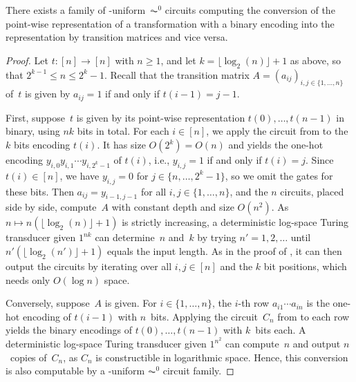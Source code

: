 \begin{proposition}
	\label{prelim:thm:point-wise-to-matrices-in-AC0}
	There exists a family of \LOGSPACE-uniform~$\AC^0$ circuits computing
	the conversion of the point-wise representation of a transformation with a binary encoding
	into the representation by transition matrices and vice versa.
\end{proposition}
\begin{proof}
	Let $t \colon [n] \to [n]$ with $n \ge 1$,
	and let $k = \lfloor \log_2(n) \rfloor + 1$ as above, so that $2^{k-1} \le n \le 2^k - 1$.
	Recall that the transition matrix $A = (a_{ij})_{i,j \in \{1,\ldots,n\}}$ of~$t$
	is given by $a_{ij} = 1$ if and only if $t(i-1) = j-1$.
	
	First, suppose~$t$ is given by its point-wise representation
	$t(0), \ldots, t(n-1)$ in binary, using $nk$ bits in total.
	For each $i \in [n]$, we apply the circuit
	from 
	to the $k$ bits encoding $t(i)$.
	It has size $O(2^k) = O(n)$ and yields the one-hot encoding
	$y_{i,0} y_{i,1} \cdots y_{i,2^k - 1}$ of $t(i)$,
	i.e., $y_{i,j} = 1$ if and only if $t(i) = j$.
	Since $t(i) \in [n]$, we have $y_{i,j} = 0$ for $j \in \{n, \ldots, 2^k - 1\}$,
	so we omit the gates for these bits.
	Then $a_{ij} = y_{i-1,j-1}$ for all $i,j \in \{1,\ldots,n\}$,
	and the $n$ circuits, placed side by side, compute~$A$
	with constant depth and size $O(n^2)$.
	As $n \mapsto n(\lfloor \log_2(n) \rfloor + 1)$ is strictly increasing,
	a deterministic log-space Turing transducer given $1^{nk}$
	can determine~$n$ and~$k$ by trying $n' = 1, 2, \ldots$
	until $n'(\lfloor \log_2(n') \rfloor + 1)$ equals the input length.
	As in the proof of ,
	it can then output the circuits by iterating over all $i, j \in [n]$ and the $k$ bit positions,
	which needs only $O(\log n)$ space.
	
	Conversely, suppose~$A$ is given.
	For $i \in \{1,\ldots,n\}$, the $i$-th row $a_{i1} \cdots a_{in}$
	is the one-hot encoding of $t(i-1)$ with $n$~bits.
	Applying the circuit~$C_n$
	from 
	to each row yields the binary encodings of $t(0), \ldots, t(n-1)$
	with $k$~bits each.
	A deterministic log-space Turing transducer given $1^{n^2}$
	can compute~$n$ and output $n$~copies of~$C_n$,
	as $C_n$ is constructible in logarithmic space.
	Hence, this conversion is also computable by a \LOGSPACE-uniform $\AC^0$ circuit family.
\end{proof}

